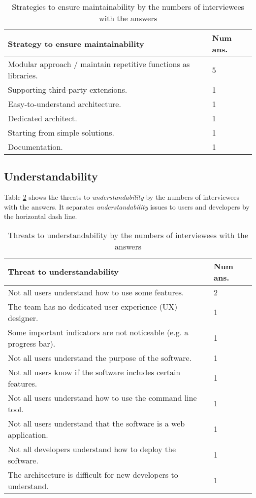 \begin{table}[H]
\centering
\begin{tabular}{ll}
\hline
Strategy to ensure maintainability & Num ans. \\ \hline
Modular approach / maintain repetitive functions as libraries. & 5 \\
Supporting third-party extensions. & 1 \\
Easy-to-understand architecture. & 1 \\
Dedicated architect. & 1 \\
Starting from simple solutions. & 1 \\
Documentation. & 1 \\ \hline
\end{tabular}
\caption{\label{tab_q16_strategies_maintainability}Strategies to ensure maintainability by the numbers of interviewees with the answers}
\end{table}

\subsection{Understandability}
\label{sec_interview_understandability}

Table \ref{tab_q17_threats_understandability} shows the threats to \textit{understandability} by the numbers of interviewees with the answers. It separates \textit{understandability} issues to users and developers by the horizontal dash line.

\begin{table}[H]
\centering
\begin{tabular}{ll}
\hline
Threat to understandability & Num ans. \\ \hline
Not all users understand how to use some features. & 2 \\
The team has no dedicated user experience (UX) designer. & 1 \\
Some important indicators are not noticeable (e.g. a progress bar). & 1 \\
Not all users understand the purpose of the software. & 1 \\
Not all users know if the software includes certain features. & 1 \\
Not all users understand how to use the command line tool. & 1 \\
Not all users understand that the software is a web application. & 1 \\\hdashline
Not all developers understand how to deploy the software. & 1 \\
The architecture is difficult for new developers to understand. & 1 \\ \hline
\end{tabular}
\caption{\label{tab_q17_threats_understandability}Threats to understandability by the numbers of interviewees with the answers}
\end{table}

